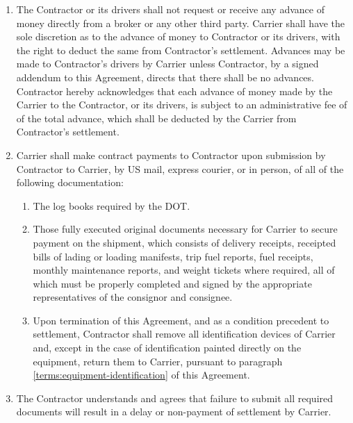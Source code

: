 {\begin{enumerate}[ 
        ref = \SecondLevelEnumerator
    ]
        \item The Contractor or its drivers shall not request or receive
        any advance of money directly from a broker or any other third
        party. Carrier shall have the sole discretion as to the advance of
        money to Contractor or its drivers, with the right to deduct the
        same from Contractor's settlement. Advances may be made to
        Contractor's drivers by Carrier unless Contractor, by a signed
        addendum to this Agreement, directs that there shall be no
        advances. Contractor hereby acknowledges that each advance of money
        made by the Carrier to the Contractor, or its drivers, is subject
        to an administrative fee of {\bfseries \CashAdvanceServiceFee} of
        the total advance, which shall be deducted by the Carrier from
        Contractor's settlement.

        \item Carrier shall make contract payments to Contractor upon
        submission by Contractor to Carrier, by US mail, express courier,
        or in person, of all of the following documentation:
        \begin{enumerate}[
            ref = \ThirdLevelEnumerator
        ]
            \item The log books required by the DOT.
            
            \item Those fully executed original documents necessary for
            Carrier to secure payment on the shipment, which consists of
            delivery receipts, receipted bills of lading or loading
            manifests, trip fuel reports, fuel receipts, monthly
            maintenance reports, and weight tickets where required, all of
            which must be properly completed and signed by the appropriate
            representatives of the consignor and consignee.
            
            \item Upon termination of this Agreement, and as a condition
            precedent to settlement, Contractor shall remove all
            identification devices of Carrier and, except in the case of
            identification painted directly on the equipment, return them
            to Carrier, pursuant to paragraph
            \ref{terms:equipment-identification} of this Agreement.
        \end{enumerate}

        \item The Contractor understands and agrees that failure to submit
        all required documents will result in a delay or non-payment of
        settlement by Carrier.


\end{enumerate}}

